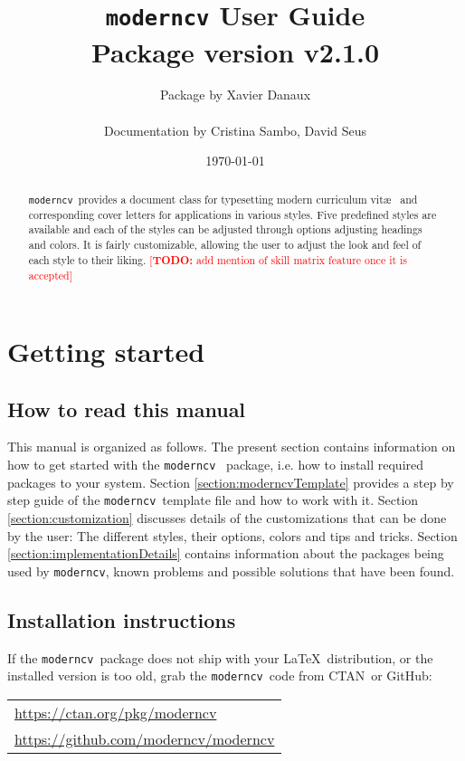 \documentclass[a4paper,11pt]{article}
\title{\texttt{moderncv} User Guide\\{\small Package version v2.1.0}}
\author{Package by Xavier Danaux \\ \begin{small}Documentation by Cristina Sambo, David Seus \end{small}}
\date{\today}
\newcommand{\todox}[1]{\textcolor{red}{[\textbf{TODO:} #1]}}
\newcommand{\code}[1]{\lstinline!#1!}
\newcommand{\Code}[1]{\lstinline!#1!~} %
\newcommand{\moderncv}{\code{moderncv}}
\newcommand{\Moderncv}{\Code{moderncv}}
\newcommand{\github}{GitHub}
\newcommand{\Ctan}{CTAN~}
\newcommand{\moderncvGithub}{\url{https://github.com/moderncv/moderncv}}
\newcommand{\moderncvCtan}{\url{https://ctan.org/pkg/moderncv}}
\begin{document}
\maketitle
\begin{abstract}
\noindent 
\Moderncv provides a document class for typesetting modern curriculum vit\ae~ and corresponding cover letters 
for applications in various styles. 
Five predefined styles are available and each of the styles can be adjusted through options adjusting headings and colors.  
It is fairly customizable, allowing the user to adjust the look and feel of each style to their liking.
\todox{add mention of skill matrix feature once it is accepted}
\end{abstract}
\tableofcontents

\section{Getting started}
\subsection{How to read this manual}
This manual is organized as follows.
The present section contains information on how to get started with the \Moderncv 
package, i.e. how to install required packages to your system.
% 
% 
Section \ref{section:moderncvTemplate} provides a step by step guide of the \Moderncv template file and how to work with it. 
% 
Section \ref{section:customization} discusses details of the customizations that can be done by the user: 
The different styles, their options, colors and tips and tricks.
% 
Section \ref{section:implementationDetails} contains information about the packages being used by \moderncv, 
known problems and possible solutions that have been found. 

\subsection{Installation instructions}
If the \Moderncv package does not ship with your \LaTeX\ distribution, or the installed version is too old, 
grab the \Moderncv code from \Ctan or \github: \medskip

\begin{tabular}{l}
  \moderncvCtan \\%
  \moderncvGithub
\end{tabular}
\end{document}
